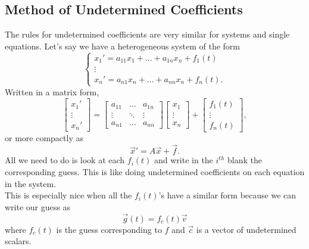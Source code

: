\subsection{Method of Undetermined Coefficients}
\noindent
The rules for undetermined coefficients are very similar for systems and single equations.
Let's say we have a heterogeneous system of the form
\begin{equation*}
	\begin{cases}
		x_1' = a_{11}x_1 + \ldots + a_{1n}x_n + f_1(t) \\
		\vdots \\
		x_n' = a_{n1}x_n + \ldots + a_{nn}x_n + f_n(t).
	\end{cases}
\end{equation*}
Written in a matrix form,
\begin{equation*}
	\begin{bmatrix}
		x_1' \\
		\vdots \\
		x_n'
	\end{bmatrix} = \begin{bmatrix}
		a_{11} & \ldots & a_{1n} \\
		\vdots & \ddots & \vdots \\
		a_{n1} & \ldots & a_{nn}
	\end{bmatrix} \begin{bmatrix}
		x_1 \\
		\vdots \\
		x_n
	\end{bmatrix} + \begin{bmatrix}
		f_1(t) \\
		\vdots \\
		f_n(t)
	\end{bmatrix},
\end{equation*}
or more compactly as
\begin{equation*}
	\vec{x}' = A\vec{x} + \vec{f}.
\end{equation*}
All we need to do is look at each $f_i(t)$ and write in the $i^{th}$ blank the corresponding guess.
This is like doing undetermined coefficients on each equation in the system.\\

\noindent
This is especially nice when all the $f_i(t)$'s have a similar form because we can write our guess as
\begin{equation*}
	\vec{g}(t) = f_c(t)\vec{v}
\end{equation*}
where $f_c(t)$ is the guess corresponding to $f$ and $\vec{c}$ is a vector of undetermined scalars.


